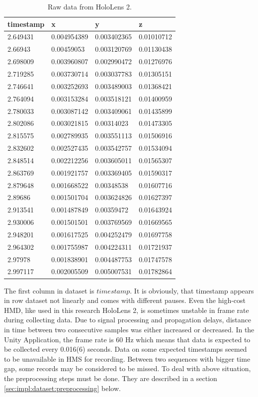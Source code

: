 \begin{table}[!ht]
		\footnotesize
		\centering
	\begin{tabular}{|l|l|l|l|}
		\hline
		timestamp & x & y & z \\ [0.5ex] 
		\hline\hline
		2.649431 & 0.004954389 & 0.003402365 & 0.01010712 \\ \hline
		2.66943 & 0.00459053 & 0.003120769 & 0.01130438 \\ \hline
		2.698009 & 0.003960807 & 0.002990472 & 0.01276976 \\ \hline
		2.719285 & 0.003730714 & 0.003037783 & 0.01305151 \\ \hline
		2.746641 & 0.003252693 & 0.003489003 & 0.01368421 \\ \hline
		2.764094 & 0.003153284 & 0.003518121 & 0.01400959 \\ \hline
		2.780033 & 0.003087142 & 0.003409061 & 0.01435899 \\ \hline
		2.802086 & 0.003021815 & 0.00314023 & 0.01473305 \\ \hline
		2.815575 & 0.002789935 & 0.003551113 & 0.01506916 \\ \hline
		2.832602 & 0.002527435 & 0.003542757 & 0.01534094 \\ \hline
		2.848514 & 0.002212256 & 0.003605011 & 0.01565307 \\ \hline
		2.863769 & 0.001921757 & 0.003369405 & 0.01590317 \\ \hline
		2.879648 & 0.001668522 & 0.00348538 & 0.01607716 \\ \hline
		2.89686 & 0.001501704 & 0.003624826 & 0.01627397 \\ \hline
		2.913541 & 0.001487849 & 0.00359472 & 0.01643924 \\ \hline
		2.930006 & 0.001501501 & 0.003769569 & 0.01669565 \\ \hline
		2.948201 & 0.001617525 & 0.004252479 & 0.01697758 \\ \hline
		2.964302 & 0.001755987 & 0.004224311 & 0.01721937 \\ \hline
		2.97978 & 0.001838901 & 0.004487753 & 0.01747578 \\ \hline
		2.997117 & 0.002005509 & 0.005007531 & 0.01782864 \\ \hline
	\end{tabular}
\caption{\label{tab:raw_data}Raw data from HoloLens 2.}
\end{table}

The first column in dataset is $timestamp$. It is obviously, that timestamp appears in row dataset not linearly and comes with different pauses. Even the high-cost HMD, like used in this research HoloLens 2, is sometimes unstable in frame rate during collecting data. Due to signal processing and propagation delays, distance in time between two consecutive samples was either increased or decreased.
In the Unity Application, the frame rate is 60 Hz which means that data is expected to be collected every 0.016(6) seconds. Data on some expected timestamps seemed to be unavailable in HMS for recording. Between two sequences with bigger time gap, some records may be considered to be missed. To deal with above situation, the preprocessing steps must be done. They are described in a section \ref{sec:impl:dataset:preprocessing} below. 

